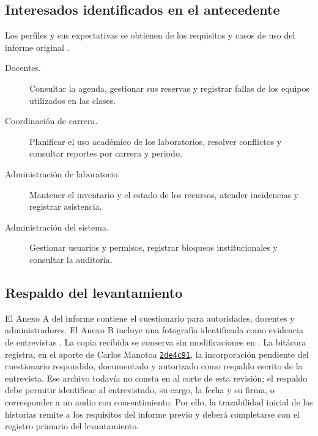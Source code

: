 {  \subsection{Interesados identificados en el antecedente}
  Los perfiles y sus expectativas se obtienen de los requisitos y casos de uso
  del informe original \cite[pp.~14--15, 20, 25--32]{clabAntecedente2026}.
  \begin{description}
    \item[Docentes.] Consultar la agenda, gestionar sus reservas y registrar
    fallas de los equipos utilizados en las clases.
    \item[Coordinación de carrera.] Planificar el uso académico de los
    laboratorios, resolver conflictos y consultar reportes por carrera y periodo.
    \item[Administración de laboratorio.] Mantener el inventario y el estado
    de los recursos, atender incidencias y registrar asistencia.
    \item[Administración del sistema.] Gestionar usuarios y permisos,
    registrar bloqueos institucionales y consultar la auditoría.
  \end{description}

  \subsection{Respaldo del levantamiento}
  El Anexo A del informe contiene el cuestionario para autoridades, docentes y
  administradores. El Anexo B incluye una fotografía identificada como
  evidencia de entrevistas \cite[pp.~45--47]{clabAntecedente2026}. La copia
  recibida se conserva sin modificaciones en
  .
  La bitácora registra, en el aporte de Carlos Manotoa
  \href{https://github.com/Danxxx777/clab-pfc-7a/commit/2de4c91}{\texttt{2de4c91}},
  la incorporación pendiente del cuestionario respondido, documentado y
  autorizado como respaldo escrito de la entrevista. Ese archivo todavía
  no consta en  al corte de esta revisión; el respaldo
  debe permitir identificar al entrevistado, su cargo, la fecha y su firma,
  o corresponder a un audio con consentimiento. Por ello,
  la trazabilidad inicial de las historias remite a los requisitos del informe
  previo y deberá completarse con el registro primario del levantamiento.
}

